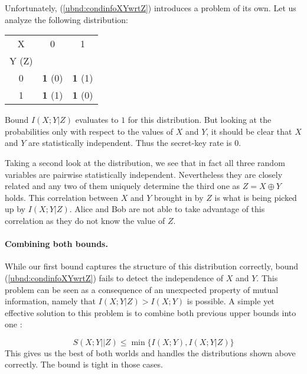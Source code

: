 \documentclass[a4paper, twoside, openany]{report}
\newcommand{\srate}{S(X;Y||Z)}
\newcommand{\p}[1]{\textbf{#1}}
\theoremstyle{plain}
\theoremstyle{definition}
\begin{document}
Unfortunately, (\ref{ubnd:condinfoXYwrtZ}) introduces a problem of its own. Let us analyze the following distribution:

\begin{center}
\begin{tabular}{|c||c|c|}
\hline
X     &     0     &     1     \\
Y (Z) &           &           \\
\hline\hline
0     & \p{1} (0) & \p{1} (1) \\
\hline
1     & \p{1} (1) & \p{1} (0) \\
\hline
\end{tabular}
\end{center}


Bound $I(X;Y|Z)$ evaluates to $1$ for this distribution. But looking at the probabilities only with respect to the values of $X$ and $Y$, it should be clear that $X$ and $Y$ are statistically independent. Thus the secret-key rate is 0.

Taking a second look at the distribution, we see that in fact all three random variables are pairwise statistically independent. Nevertheless they are closely related and any two of them uniquely determine the third one as $Z = X \oplus Y$ holds. This correlation between $X$ and $Y$ brought in by $Z$ is what is being picked up by $I(X;Y|Z)$. Alice and Bob are not able to take advantage of this correlation as they do not know the value of $Z$.

\paragraph{Combining both bounds.} While our first bound captures the structure of this distribution correctly, bound (\ref{ubnd:condinfoXYwrtZ}) fails to detect the independence of $X$ and $Y$. This problem can be seen as a consequence of an unexpected property of mutual information, namely that $I(X;Y|Z) > I(X;Y)$ is possible. A simple yet effective solution to this problem is to combine both previous upper bounds into one \cite{ka}:

\begin{equation} \label{ubnd:minInfoCondinfo}
\srate \leq \min \{I(X;Y), I(X;Y|Z)\}
\end{equation}
This gives us the best of both worlds and handles the distributions shown above correctly. The bound is tight in those cases.

\end{document}
